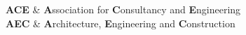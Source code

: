 {
\textbf{ACE} & \textbf{A}ssociation for \textbf{C}onsultancy and \textbf{E}ngineering \\
%
\textbf{AEC} & \textbf{A}rchitecture, \textbf{E}ngineering and \textbf{C}onstruction \\
}